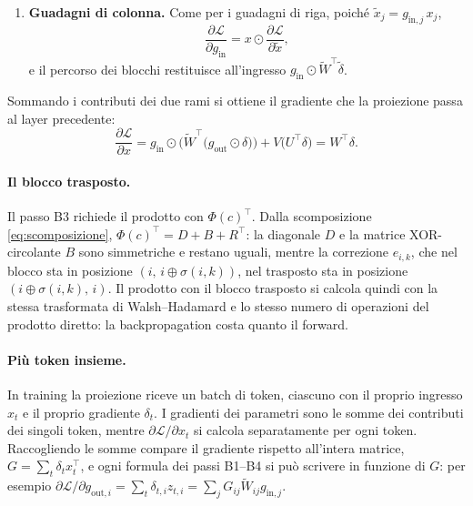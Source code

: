 \begin{enumerate}
\begin{itemize}
\item il gradiente da passare indietro: $\dfrac{\partial\mathcal L}{\partial\tilde x_{[q]}}=\sum_{p=1}^{P}\alpha^{(p,q)}\,\Phi\big(c^{(p,q)}\big)^{\top}\tilde\delta_{[p]}$, cioè $\dfrac{\partial\mathcal L}{\partial\tilde x}=\widetilde W^\top\tilde\delta$.
\end{itemize}
\item[\textbf{B4.}] \textbf{Guadagni di colonna.} Come per i guadagni di riga, poiché $\tilde x_j=g_{\mathrm{in},j}\,x_j$,
\[
\frac{\partial\mathcal L}{\partial g_{\mathrm{in}}}=x\odot\frac{\partial\mathcal L}{\partial\tilde x},
\]
e il percorso dei blocchi restituisce all'ingresso $g_{\mathrm{in}}\odot\widetilde W^\top\tilde\delta$.
\end{enumerate}

Sommando i contributi dei due rami si ottiene il gradiente che la proiezione passa al layer precedente:
\begin{equation}
\frac{\partial\mathcal L}{\partial x}
= g_{\mathrm{in}}\odot\Big(\widetilde W^{\top}\big(g_{\mathrm{out}}\odot\delta\big)\Big) + V\big(U^\top\delta\big)
= W^\top\delta .
\label{eq:grad-ingresso}
\end{equation}

\paragraph{Il blocco trasposto.} Il passo B3 richiede il prodotto con $\Phi(c)^\top$. Dalla scomposizione \eqref{eq:scomposizione}, $\Phi(c)^\top = D + B + R^\top$: la diagonale $D$ e la matrice XOR-circolante $B$ sono simmetriche e restano uguali, mentre la correzione $e_{i,k}$, che nel blocco sta in posizione $(i,\,i\oplus\sigma(i,k))$, nel trasposto sta in posizione $(i\oplus\sigma(i,k),\,i)$. Il prodotto con il blocco trasposto si calcola quindi con la stessa trasformata di Walsh--Hadamard e lo stesso numero di operazioni del prodotto diretto: la backpropagation costa quanto il forward.

\paragraph{Più token insieme.} In training la proiezione riceve un batch di token, ciascuno con il proprio ingresso $x_t$ e il proprio gradiente $\delta_t$. I gradienti dei parametri sono le somme dei contributi dei singoli token, mentre $\partial\mathcal L/\partial x_t$ si calcola separatamente per ogni token. Raccogliendo le somme compare il gradiente rispetto all'intera matrice, $G=\sum_t\delta_t x_t^\top$, e ogni formula dei passi B1--B4 si può scrivere in funzione di $G$: per esempio $\partial\mathcal L/\partial g_{\mathrm{out},i}=\sum_t\delta_{t,i}z_{t,i}=\sum_j G_{ij}\widetilde W_{ij}g_{\mathrm{in},j}$.

